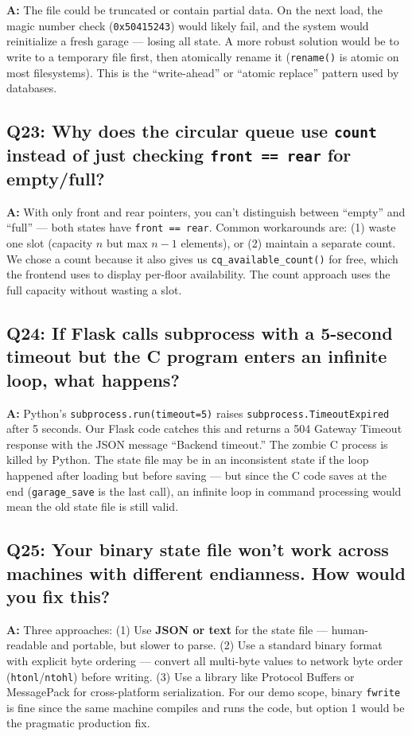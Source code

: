 \documentclass[12pt, a4paper]{article}
\begin{document}
\textbf{A:} The file could be truncated or contain partial data. On the next load, the magic number check (\texttt{0x50415243}) would likely fail, and the system would reinitialize a fresh garage --- losing all state. A more robust solution would be to write to a temporary file first, then atomically rename it (\texttt{rename()} is atomic on most filesystems). This is the ``write-ahead'' or ``atomic replace'' pattern used by databases.

\subsection{Q23: Why does the circular queue use \texttt{count} instead of just checking \texttt{front == rear} for empty/full?}

\textbf{A:} With only front and rear pointers, you can't distinguish between ``empty'' and ``full'' --- both states have \texttt{front == rear}. Common workarounds are: (1) waste one slot (capacity $n$ but max $n{-}1$ elements), or (2) maintain a separate count. We chose a count because it also gives us \texttt{cq\_available\_count()} for free, which the frontend uses to display per-floor availability. The count approach uses the full capacity without wasting a slot.

\subsection{Q24: If Flask calls subprocess with a 5-second timeout but the C program enters an infinite loop, what happens?}

\textbf{A:} Python's \texttt{subprocess.run(timeout=5)} raises \texttt{subprocess.TimeoutExpired} after 5 seconds. Our Flask code catches this and returns a 504 Gateway Timeout response with the JSON message ``Backend timeout.'' The zombie C process is killed by Python. The state file may be in an inconsistent state if the loop happened after loading but before saving --- but since the C code saves at the end (\texttt{garage\_save} is the last call), an infinite loop in command processing would mean the old state file is still valid.

\subsection{Q25: Your binary state file won't work across machines with different endianness. How would you fix this?}

\textbf{A:} Three approaches: (1) Use \textbf{JSON or text} for the state file --- human-readable and portable, but slower to parse. (2) Use a standard binary format with explicit byte ordering --- convert all multi-byte values to network byte order (\texttt{htonl}/\texttt{ntohl}) before writing. (3) Use a library like Protocol Buffers or MessagePack for cross-platform serialization. For our demo scope, binary \texttt{fwrite} is fine since the same machine compiles and runs the code, but option 1 would be the pragmatic production fix.
\end{document}
